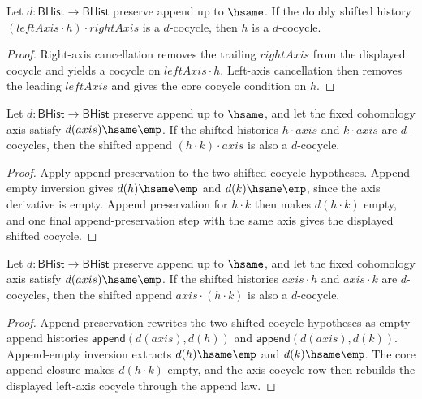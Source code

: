 \begin{theorem}
\label{thm:cohomology-cocycle-axis-bilateral-cancel}
Let $d:\mathsf{BHist}\to\mathsf{BHist}$ preserve append up to $\hsame$. If
the doubly shifted history $(leftAxis\cdot h)\cdot rightAxis$ is a
$d$-cocycle, then $h$ is a $d$-cocycle.
\end{theorem}
\begin{proof}
Right-axis cancellation removes the trailing $rightAxis$ from the displayed
cocycle and yields a cocycle on $leftAxis\cdot h$. Left-axis cancellation then
removes the leading $leftAxis$ and gives the core cocycle condition on $h$.
\end{proof}

\begin{theorem}
\label{thm:cohomology-cocycle-append-closed}
Let $d:\mathsf{BHist}\to\mathsf{BHist}$ preserve append up to $\hsame$, and
let the fixed cohomology axis satisfy $d(axis)\hsame\emp$. If the shifted
histories $h\cdot axis$ and $k\cdot axis$ are $d$-cocycles, then the shifted
append $(h\cdot k)\cdot axis$ is also a $d$-cocycle.
\end{theorem}
\begin{proof}
Apply append preservation to the two shifted cocycle hypotheses. Append-empty
inversion gives $d(h)\hsame\emp$ and $d(k)\hsame\emp$, since the axis
derivative is empty. Append preservation for $h\cdot k$ then makes
$d(h\cdot k)$ empty, and one final append-preservation step with the same
axis gives the displayed shifted cocycle.
\end{proof}

\begin{theorem}
\label{thm:cohomology-cocycle-prepend-axis-closed}
Let $d:\mathsf{BHist}\to\mathsf{BHist}$ preserve append up to $\hsame$, and
let the fixed cohomology axis satisfy $d(axis)\hsame\emp$. If the shifted
histories $axis\cdot h$ and $axis\cdot k$ are $d$-cocycles, then the shifted
append $axis\cdot(h\cdot k)$ is also a $d$-cocycle.
\end{theorem}
\begin{proof}
Append preservation rewrites the two shifted cocycle hypotheses as empty
append histories $\mathsf{append}(d(axis),d(h))$ and
$\mathsf{append}(d(axis),d(k))$. Append-empty inversion extracts
$d(h)\hsame\emp$ and $d(k)\hsame\emp$. The core append closure makes
$d(h\cdot k)$ empty, and the axis cocycle row then rebuilds the displayed
left-axis cocycle through the append law.
\end{proof}

